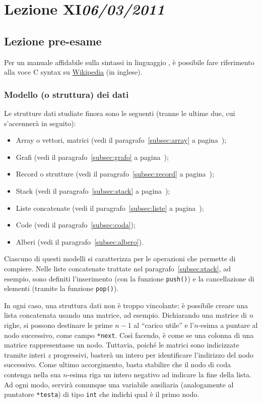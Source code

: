 \chapter[Lezione XI]{Lezione XI\newline\small{\emph{06/03/2011}}}

	\section{Lezione pre-esame}

Per un manuale affidabile sulla sintassi in linguaggio , è possibile fare riferimento alla voce \textsf{C syntax} su \href{http://en.wikipedia.org/wiki/Main_Page}{Wikipedia} (in inglese).
		\subsection{Modello (o struttura) dei dati}
Le strutture dati studiate finora sono le seguenti (tranne le ultime due, cui s'accennerà in seguito):
\begin{itemize}[noitemsep]
	\item
Array o vettori, matrici (vedi il paragrafo~\ref{subsec:array} a pagina~\pageref{subsec:array});
	\item
Grafi (vedi il paragrafo~\ref{subsec:grafo} a pagina~\pageref{sucsec:grafo});
	\item
Record o strutture (vedi il paragrafo~\ref{subsec:record} a pagina~\pageref{subsec:record});
	\item
Stack (vedi il paragrafo~\ref{subsec:stack} a pagina~\pageref{sucsec:stack});
	\item
Liste concatenate (vedi il paragrafo~\ref{subsec:liste} a pagina~\pageref{sucsec:liste});
	\item
Code (vedi il paragrafo~\ref{subsec:coda});
	\item
Alberi (vedi il paragrafo~\ref{subsec:albero}).
\end{itemize}
Ciascuno di questi modelli si caratterizza per le operazioni che permette di compiere.
Nelle liste concatenate trattate nel  paragrafo~\ref{subsec:stack}, ad esempio, sono definiti l'inserimento (con la funzione \lstinline!push()!) e la cancellazione di elementi (tramite la funzione \lstinline!pop()!).


In ogni caso, una struttura dati non è troppo vincolante: è possibile creare una lista concatenata usando una matrice, ad esempio.
Dichiarando una matrice di $n$ righe, si possono destinare le prime $n-1$ al ``carico utile'' e l'$n$-esima a puntare al nodo successivo, come campo \lstinline!*next!.
Così facendo, è come se una colonna di una matrice rappresentasse un nodo.
Tuttavia, poiché le matrici sono indicizzate tramite interi $z$ progressivi, basterà un intero per identificare l'indirizzo del nodo successivo.
Come ultimo accorgimento, basta stabilire che il nodo di coda contenga nella sua $n$-esima riga un intero negativo ad indicare la fine della lista.
Ad ogni modo, servirà comunque una variabile ausiliaria (analogamente al puntatore \lstinline!*testa!) di tipo \lstinline!int! che indichi qual è il primo nodo.



